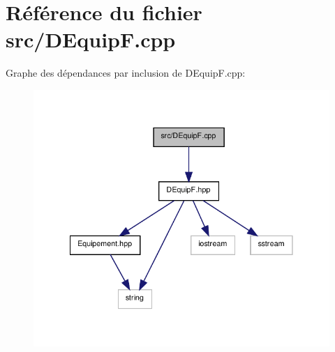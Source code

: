 \section{Référence du fichier src/\-D\-Equip\-F.cpp}
\label{_d_equip_f_8cpp}
Graphe des dépendances par inclusion de D\-Equip\-F.\-cpp\-:\nopagebreak
\begin{figure}[H]
\begin{center}
\leavevmode
\includegraphics[width=318pt]{_d_equip_f_8cpp__incl}
\end{center}
\end{figure}
